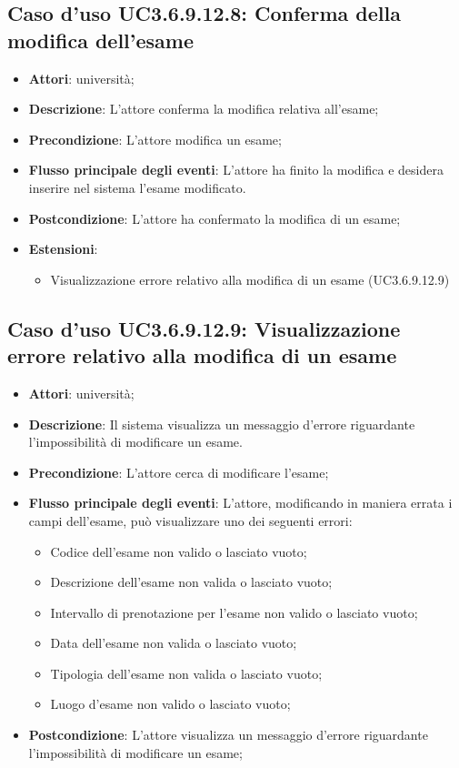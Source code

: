 \subsection{Caso d'uso \texorpdfstring{UC3.6.9.12.8}{UC3.6.9.12.8}: Conferma della modifica dell’esame}
\begin{itemize}
\item \textbf{Attori}: università;
\item \textbf{Descrizione}: L'attore conferma la modifica relativa all'esame;

\item \textbf{Precondizione}: L'attore modifica un esame;

\item \textbf{Flusso principale degli eventi}: L'attore ha finito la modifica e desidera inserire nel sistema l'esame modificato.

\item \textbf{Postcondizione}: L'attore ha confermato la modifica di un esame;

\item \textbf{Estensioni}:
\begin{itemize}
\item Visualizzazione errore relativo alla modifica di un esame (UC3.6.9.12.9)
\end{itemize}
\end{itemize}
\subsection{Caso d'uso \texorpdfstring{UC3.6.9.12.9}{UC3.6.9.12.9}: Visualizzazione errore relativo alla modifica di un esame}
\begin{itemize}
\item \textbf{Attori}: università;
\item \textbf{Descrizione}: Il sistema visualizza un messaggio d'errore riguardante l'impossibilità di modificare un esame.

\item \textbf{Precondizione}: L'attore cerca di modificare l'esame;

\item \textbf{Flusso principale degli eventi}: L'attore, modificando in maniera errata i campi dell'esame, può visualizzare uno dei seguenti errori: \begin{itemize} 
\item Codice dell’esame non valido o lasciato vuoto; 
\item Descrizione dell’esame non valida o lasciato vuoto; 
\item Intervallo di prenotazione per l’esame non valido o lasciato vuoto; 
\item Data dell’esame non valida o lasciato vuoto; 
\item Tipologia dell’esame non valida o lasciato vuoto; 
\item Luogo d’esame non valido o lasciato vuoto; 
\end{itemize}
\item \textbf{Postcondizione}: L'attore visualizza un messaggio d'errore riguardante l'impossibilità di modificare un esame;

\end{itemize}
